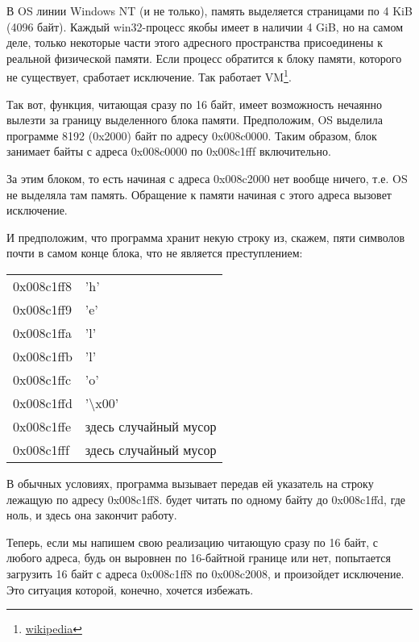 \newcommand{\URLPAGE}{\href{http://en.wikipedia.org/wiki/Page_(computer_memory)}{wikipedia}}

В \ac{OS} линии \gls{Windows NT} (и не только), память выделяется страницами по 4 KiB (4096 байт). 
Каждый win32-процесс якобы имеет в наличии 4 GiB, но на самом деле, 
только некоторые части этого адресного пространства присоединены к реальной физической памяти. 
Если процесс обратится к блоку памяти, которого не существует, сработает исключение. 
Так работает \ac{VM}\footnote{\URLPAGE}.

Так вот, функция, читающая сразу по 16 байт, имеет возможность нечаянно вылезти за границу 
выделенного блока памяти. 
Предположим, \ac{OS} выделила программе 8192 (0x2000) байт по адресу 0x008c0000. 
Таким образом, блок занимает байты с адреса 0x008c0000 по 0x008c1fff включительно.

За этим блоком, то есть начиная с адреса 0x008c2000 нет вообще ничего, т.е. \ac{OS} не выделяла там память. 
Обращение к памяти начиная с этого адреса вызовет исключение.

И предположим, что программа хранит некую строку из, скажем, пяти символов почти в самом конце блока, 
что не является преступлением:

\begin{center}
  \begin{tabular}{ | l | l | }
    \hline
        0x008c1ff8 & 'h' \\
        0x008c1ff9 & 'e' \\
        0x008c1ffa & 'l' \\
        0x008c1ffb & 'l' \\
        0x008c1ffc & 'o' \\
        0x008c1ffd & '\textbackslash{}x00' \\
        0x008c1ffe & здесь случайный мусор \\
        0x008c1fff & здесь случайный мусор \\
    \hline
  \end{tabular}
\end{center}

В обычных условиях, программа вызывает \strlen передав ей указатель на строку  
лежащую по адресу 0x008c1ff8. 
\strlen будет читать по одному байту до 0x008c1ffd, где ноль, и здесь она закончит работу.

Теперь, если мы напишем свою реализацию \strlen читающую сразу по 16 байт, с любого адреса, 
будь он выровнен по 16-байтной границе или нет, 
\MOVDQU попытается загрузить 16 байт с адреса 0x008c1ff8 по 0x008c2008, и произойдет исключение. 
Это ситуация которой, конечно, хочется избежать.

